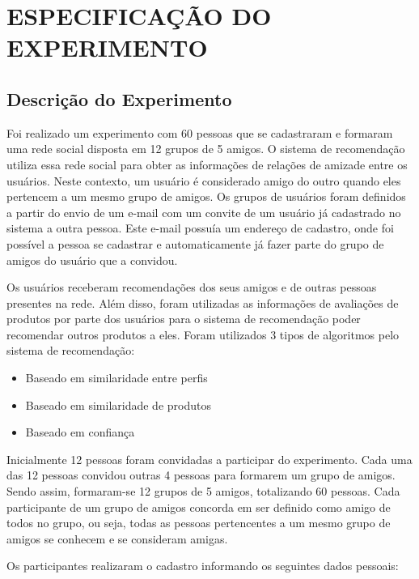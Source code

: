\chapter{ESPECIFICAÇÃO DO EXPERIMENTO} %
\label{cha:especificacao_do_experimento} %

\section{Descrição do Experimento}
\label{cha:descricao_do_experimento}

Foi realizado um experimento com 60 pessoas que se cadastraram e formaram uma rede social disposta em 12 grupos de 5 amigos. O sistema de recomendação utiliza essa rede social para obter as informações de relações de amizade entre os usuários. Neste contexto, um usuário é considerado amigo do outro quando eles pertencem a um mesmo grupo de amigos. Os grupos de usuários foram definidos a partir do envio de um e-mail com um convite de um usuário já cadastrado no sistema a outra pessoa. Este e-mail possuía um endereço de cadastro, onde foi possível a pessoa se cadastrar e automaticamente já fazer parte do grupo de amigos do usuário que a convidou.

Os usuários receberam recomendações dos seus amigos e de outras pessoas presentes na rede. Além disso, foram utilizadas as informações de avaliações de produtos por parte dos usuários para o sistema de recomendação poder recomendar outros produtos a eles. Foram utilizados 3 tipos de algoritmos pelo sistema de recomendação:

\begin{itemize}
  \item Baseado em similaridade entre perfis
  \item Baseado em similaridade de produtos
  \item Baseado em confiança
\end{itemize}

Inicialmente 12 pessoas foram convidadas a participar do experimento. Cada uma das 12 pessoas convidou outras 4 pessoas para formarem um grupo de amigos. Sendo assim, formaram-se 12 grupos de 5 amigos, totalizando 60 pessoas. Cada participante de um grupo de amigos concorda em ser definido como amigo de todos no grupo, ou seja, todas as pessoas pertencentes a um mesmo grupo de amigos se conhecem e se consideram amigas.

Os participantes realizaram o cadastro informando os seguintes dados pessoais:

